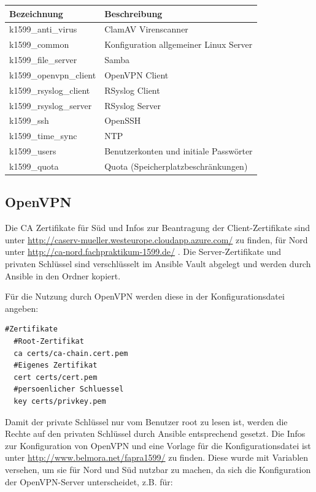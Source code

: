 \begin{minipage}{\textwidth}
\begin{center}
\begin{tabular}{lp{12cm}}
\toprule
Bezeichnung & Beschreibung \\
\midrule
k1599\_anti\_virus & ClamAV Virenscanner \\
k1599\_common & Konfiguration allgemeiner Linux Server \\
k1599\_file\_server & Samba \\
k1599\_openvpn\_client & OpenVPN Client \\
k1599\_rsyslog\_client & RSyslog Client \\
k1599\_rsyslog\_server & RSyslog Server \\
k1599\_ssh & OpenSSH \\
k1599\_time\_sync & NTP \\
k1599\_users & Benutzerkonten und initiale Passwörter \\
k1599\_quota & Quota (Speicherplatzbeschränkungen) \\
\bottomrule
\end{tabular}
\end{center}
\end{minipage}


\subsection{OpenVPN}
Die CA Zertifikate für Süd und Infos zur Beantragung der Client-Zertifikate sind unter \url{http://caserv-mueller.westeurope.cloudapp.azure.com/} zu finden, für Nord unter \url{http://ca-nord.fachpraktikum-1599.de/} . Die Server-Zertifikate und privaten Schlüssel sind verschlüsselt im Ansible Vault abgelegt und werden durch Ansible in den Ordner  kopiert.

Für die Nutzung durch OpenVPN werden diese in der Konfigurationsdatei angeben:

\begin{lstlisting}[label=code:openvpn,caption=Auszug aus /etc/openvpn/client.conf]
  #Zertifikate
  #Root-Zertifikat
  ca certs/ca-chain.cert.pem
  #Eigenes Zertifikat
  cert certs/cert.pem
  #persoenlicher Schluessel
  key certs/privkey.pem
\end{lstlisting}

Damit der private Schlüssel nur vom Benutzer root zu lesen ist, werden die Rechte auf den privaten Schlüssel durch Ansible entsprechend gesetzt. Die Infos zur Konfiguration von OpenVPN und eine Vorlage für die Konfigurationsdatei ist unter \url{http://www.belmora.net/fapra1599/} zu finden. Diese wurde mit Variablen versehen, um sie für Nord und Süd nutzbar zu machen, da sich die Konfiguration der OpenVPN-Server unterscheidet, z.B. für:


